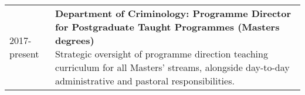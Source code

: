 \documentclass[10pt,a4paper,]{article}
\makeatletter
\def\briefitem#1#2#3{
#2 & \parbox[t]{0.85\textwidth}{%
      \textbf{#1}\\[-0.1cm]{\footnotesize #3}}\\[0.4cm]}
\def\briefsection#1{\begin{longtable}{@{\extracolsep{\fill}}ll}#1\end{longtable}}
\makeatother
\begin{document}
\briefsection{\briefitem{Department of Criminology: Programme Director for Postgraduate Taught Programmes (Masters degrees)}{2017-present}{Strategic oversight of programme direction teaching curriculum for all Masters' streams, alongside day-to-day administrative and pastoral responsibilities.}\briefitem{University of Manchester: Coordinator of the University of Manchester R User Group}{2016-2019}{Direction and organisation of user group activities such as monthly meetings, hackathons, and preparation of joint research outputs.}\briefitem{Data Carpentry Social Sciences Curriculum: Curriculum Advisory Board Member}{2016-Present}{Involvement in oversight and development of the social sciences curriculum within the Carpentries programme.}\briefitem{University of Manchester: Ad hoc administrative duties}{2016-present}{Undergraduate Open Day, Postgraduate Research (PhD) Open Day, and similar roles assisting colleagues and promoting the university}\briefitem{University of Manchester: Academic Advising}{2016-present}{Pastoral care and academic advising for undergraduate and postgraduate students enrolled in Criminology degrees.}}
\end{document}
